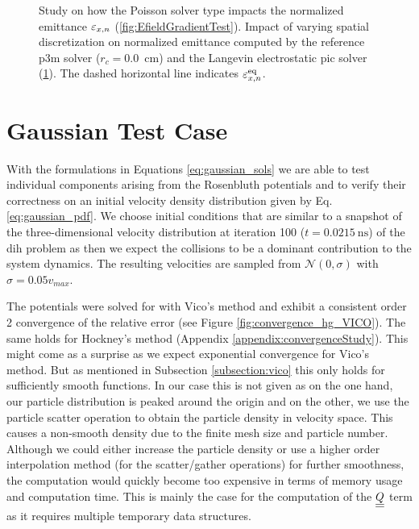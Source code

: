 \begin{figure}[h]
\begin{subfigure}[b]{0.548\textwidth}
    \caption{}
    \label{fig:meshsize_test_VICO}
  \end{subfigure}
  \caption{Study on how the Poisson solver type impacts the normalized emittance $\varepsilon_{x,n}$
      (\ref{fig:EfieldGradientTest}). Impact of varying spatial discretization on normalized
      emittance computed by the reference \gls{p3m}
      solver \cite{p3m_ulmer} ($r_c=0.0$\ cm) and the Langevin electrostatic \gls{pic} solver
(\ref{fig:meshsize_test_VICO}). The dashed horizontal line indicates $\varepsilon_{x,n}^{\text{eq}}$.}
\label{fig:DIH_collisionless}
\end{figure}

\section{Gaussian Test Case}

With the formulations in Equations \ref{eq:gaussian_sols} we are able to test individual components
arising from the Rosenbluth potentials and to verify their correctness on 
an initial velocity density distribution given by Eq. \ref{eq:gaussian_pdf}.
We choose initial conditions that are similar to a snapshot of the three-dimensional velocity distribution 
at iteration 100 ($t = 0.0215\ \text{ns}$) of the \gls{dih} problem as then we expect the collisions to be a
dominant contribution to the system dynamics. The resulting velocities are sampled from $\mathcal
N(0, \sigma)$ with $\sigma = 0.05v_{max}$.

The potentials were solved for with Vico's method and exhibit a consistent order 2 convergence of the
relative error (see Figure \ref{fig:convergence_hg_VICO}). 
The same holds for Hockney's method (Appendix \ref{appendix:convergenceStudy}).
This might come as a surprise as we expect exponential convergence for Vico's method. But as
mentioned in Subsection \ref{subsection:vico} this only holds for sufficiently smooth functions.
In our case this is not given as on the one hand, our particle distribution is peaked around the
origin and on the other, we use the particle scatter operation to obtain the particle density in velocity space.
This causes a non-smooth density due to the finite mesh size and particle number.
Although we could either increase the particle density or use a higher order interpolation method
(for the scatter/gather operations) for further smoothness, the computation would quickly become too expensive 
in terms of memory usage and computation time.
This is mainly the case for the computation of the $\underline{\underline{Q}}$ term as it requires multiple temporary data structures.

